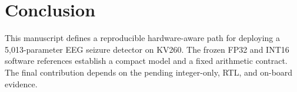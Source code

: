 \section{Conclusion}

This manuscript defines a reproducible hardware-aware path for deploying a
5,013-parameter EEG seizure detector on KV260. The frozen FP32 and INT16
software references establish a compact model and a fixed arithmetic contract.
The final contribution depends on the pending integer-only, RTL, and on-board
evidence. 
